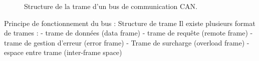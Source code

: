 \begin{figure}[htp]
  \centering
  
  \caption{Structure de la trame d'un bus de communication CAN.}
  \label{fig:structure-de-trame-blocs}
\end{figure}


Principe de fonctionnement du bus : Structure de trame
Il existe plusieurs format de trames :
- trame de données (data frame)
- trame de requête (remote frame)
- trame de gestion d’erreur (error frame)
- Trame de surcharge (overload frame)
- espace entre trame (inter-frame space)








